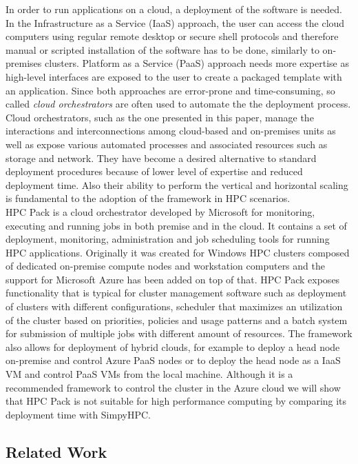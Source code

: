 \documentclass[3p,times]{elsarticle}
\begin{document}
In order to run applications on a cloud, a deployment of the software is needed. In the Infrastructure as a Service (IaaS) approach, the user can access the cloud computers using regular remote desktop or secure shell protocols and therefore manual or scripted installation of the software has to be done, similarly to on-premises clusters. Platform as a Service (PaaS) approach needs more expertise as high-level interfaces are exposed to the user to create a packaged template with an application. Since both approaches are error-prone and time-consuming, so called \textit{cloud orchestrators} are often used to automate the the deployment process. \\
Cloud orchestrators, such as the one presented in this paper, manage the interactions and interconnections among cloud-based and on-premises units as well as expose various automated processes and associated resources such as storage and network. They have become a desired alternative to standard deployment procedures because of lower level of expertise and reduced deployment time.  Also their ability to perform the vertical and horizontal scaling is fundamental to the adoption of the framework in HPC scenarios. \\
HPC Pack is a cloud orchestrator developed by Microsoft for monitoring, executing and running jobs in both premise and in the cloud. It contains a set of deployment, monitoring, administration and job scheduling tools for running HPC applications. Originally it was created for Windows HPC clusters composed of dedicated on-premise compute nodes and workstation computers and the support for Microsoft Azure has been added on top of that. HPC Pack exposes functionality that is typical for cluster management software such as deployment of clusters with different configurations, scheduler that maximizes an utilization of the cluster based on priorities, policies and usage patterns and a batch system for submission of multiple jobs with different amount of resources. The framework also allows for deployment of hybrid clouds, for example to deploy a head node on-premise and control Azure PaaS nodes or to deploy the head node as a IaaS VM and control PaaS VMs from the local machine. Although it is a recommended framework to control the cluster in the Azure cloud we will show that HPC Pack is not suitable for high performance computing by comparing its deployment time with SimpyHPC.  

\subsection{Related Work}	
\end{document}

